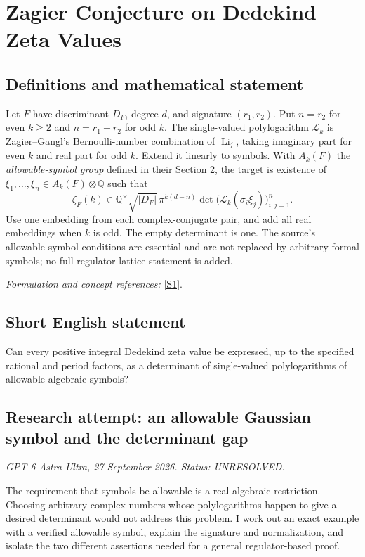 \documentclass[11pt]{article}
\begin{document}
\section*{\texorpdfstring{Zagier Conjecture on Dedekind Zeta Values}{Zagier Conjecture on Dedekind Zeta Values}}\label{271}
\subsection{Definitions and mathematical statement}
Let $F$ have discriminant $D_F$, degree $d$, and signature $(r_1,r_2)$. Put $n=r_2$ for even $k\ge2$ and $n=r_1+r_2$ for odd $k$. The single-valued polylogarithm $\mathcal L_k$ is Zagier--Gangl's Bernoulli-number combination of $\operatorname{Li}_j$, taking imaginary part for even $k$ and real part for odd $k$. Extend it linearly to symbols. With $A_k(F)$ the \emph{allowable-symbol group} defined in their Section 2, the target is existence of $\xi_1,\ldots,\xi_n\in A_k(F)\otimes{\mathbb{Q}}$ such that
\[
 \zeta_F(k)\in{\mathbb{Q}}^\times\sqrt{|D_F|}\,
 \pi^{k(d-n)}\det\bigl(\mathcal L_k(\sigma_i\xi_j)\bigr)_{i,j=1}^n.
\]
Use one embedding from each complex-conjugate pair, and add all real embeddings when $k$ is odd. The empty determinant is one. The source's allowable-symbol conditions are essential and are not replaced by arbitrary formal symbols; no full regulator-lattice statement is added.
\par\smallskip\textit{Formulation and concept references:} \href{https://people.mpim-bonn.mpg.de/zagier/files/mpim/00-9/fulltext.pdf}{[S1]}.

\subsection{Short English statement}
Can every positive integral Dedekind zeta value be expressed, up to the specified rational and period factors, as a determinant of single-valued polylogarithms of allowable algebraic symbols?
\subsection{Research attempt: an allowable Gaussian symbol and the determinant gap}
\textit{GPT-6 Astra Ultra, 27 September 2026. Status: UNRESOLVED.}

The requirement that symbols be allowable is a real algebraic restriction. Choosing arbitrary complex numbers whose polylogarithms happen to give a desired determinant would not address this problem. I work out an exact example with a verified allowable symbol, explain the signature and normalization, and isolate the two different assertions needed for a general regulator-based proof.
\end{document}
